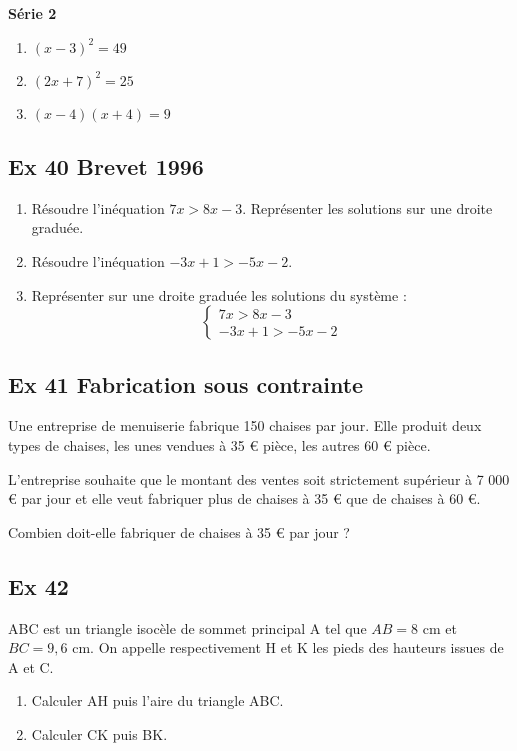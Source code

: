 \documentclass[12pt,a4paper]{article}
\begin{document}
\textbf{Série 2}
\begin{enumerate}
  \item \((x-3)^2 = 49\)
  \item \((2x+7)^2 = 25\)
  \item \((x-4)(x+4) = 9\)
\end{enumerate}

\bigskip

\subsection*{Ex 40 \; Brevet 1996}
\begin{enumerate}
  \item Résoudre l’inéquation \(7x > 8x - 3\). Représenter les solutions sur une droite graduée.
  \item Résoudre l’inéquation \(-3x+1 > -5x-2\).
  \item Représenter sur une droite graduée les solutions du système :
  \[
  \begin{cases}
  7x > 8x-3 \\
  -3x+1 > -5x-2
  \end{cases}
  \]
\end{enumerate}

\bigskip

\subsection*{Ex 41 \; Fabrication sous contrainte}
Une entreprise de menuiserie fabrique 150 chaises par jour.  
Elle produit deux types de chaises, les unes vendues à 35 € pièce, les autres 60 € pièce.

L’entreprise souhaite que le montant des ventes soit strictement supérieur à 7 000 € par jour et elle veut fabriquer plus de chaises à 35 € que de chaises à 60 €.

\medskip
Combien doit-elle fabriquer de chaises à 35 € par jour ?

\bigskip

\subsection*{Ex 42}
ABC est un triangle isocèle de sommet principal A tel que \(AB=8\) cm et \(BC=9,6\) cm.  
On appelle respectivement H et K les pieds des hauteurs issues de A et C.

\begin{enumerate}
  \item Calculer AH puis l’aire du triangle ABC.
  \item Calculer CK puis BK.
\end{enumerate}
\end{document}
